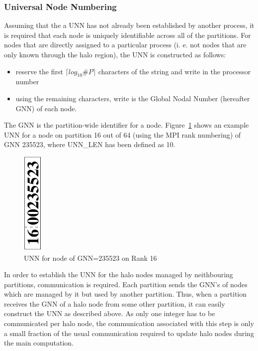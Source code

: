 \documentclass[11pt]{article}
\begin{document}
\subsubsection{Universal Node Numbering}
Assuming that the a UNN has not already been established by another
process, it is required that each node is uniquely identifiable across
all of the partitions. For nodes that are directly assigned to a
particular process (i. e. not nodes that are only known through the
halo region), the UNN is constructed as follows:
\begin{itemize}
\item reserve the first $\lceil log_{10}\#P \rceil$ characters of the string
and write in the processor number
\item using the remaining characters, write is the Global Nodal Number
(hereafter GNN) of each node.
\end{itemize}
The GNN is the partition-wide identifier for a
node. Figure~\ref{fig:UNN} shows an example UNN for a node on
partition 16 out of 64 (using the MPI rank numbering) of GNN 235523,
where UNN\_LEN has been defined as 10.
\begin{figure}[h]\label{fig:UNN}
\centering
\includegraphics[height=50mm, angle=-90]{images/UNN}
\caption{UNN for node of GNN=235523 on Rank 16}
\end{figure} 
In order to establish the UNN for the halo nodes managed by
neithbouring partitions, communication is required. Each partition
sends the GNN's of nodes which are managed by it but used by another
partition. Thus, when a partition receives the GNN of a halo node from
some other partition, it can easily construct the UNN as described
above. As only one integer has to be communicated per halo node, the
communication associated with this step is only a small fraction of
the usual communication required to update halo nodes during the main
computation.
\newpage
\end{document}
